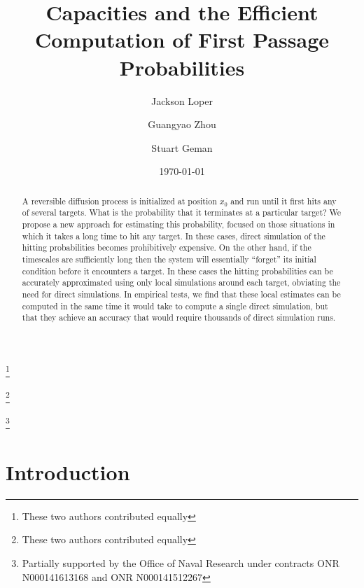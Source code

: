 \documentclass[12pt, nofootinbib,english, amsmath, amssymb, aps, priprint, graphicx,floatfix]{revtex4-1}
\theoremstyle{plain}
\theoremstyle{definition}
\theoremstyle{plain}
\begin{document}
\title{Capacities and the Efficient Computation of First 
Passage Probabilities} %

\author{Jackson Loper}
\thanks{These two authors contributed equally}

\author{Guangyao Zhou}
\thanks{These two authors contributed equally}

\author{Stuart Geman}
\thanks{Partially supported by the Office of Naval Research under contracts ONR N000141613168 and ONR N000141512267}
\date{\today}

\begin{abstract}
	A reversible diffusion process is initialized at position $x_0$ and run until it first hits any of several targets.  What is the probability that it terminates at a particular target? We propose a new approach for estimating this probability, focused on those situations in which it takes a long time to hit any target. In these 
cases,  direct simulation of the hitting probabilities becomes prohibitively expensive.  On the other hand, if the timescales are sufficiently long then the system will essentially ``forget'' its initial condition before it encounters a target.  In these cases the hitting probabilities can be accurately approximated using only local simulations around each target, obviating the need for
direct simulations.  In empirical tests, we find that these local estimates can be computed in the same time it would take to compute a single direct simulation, but that they achieve an accuracy that would require thousands of direct simulation runs.
\end{abstract}

\pacs{}%

\maketitle %

\section{Introduction}
\label{sec:Introduction}
\end{document}
